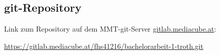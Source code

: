 \begin{appendices}

\section{git-Repository}
Link zum Repository auf dem MMT-git-Server {\url{gitlab.mediacube.at}}:

{\color{red}\url{https://gitlab.mediacube.at/fhs41216/bachelorarbeit-1-troth.git}}
	
\end{appendices}